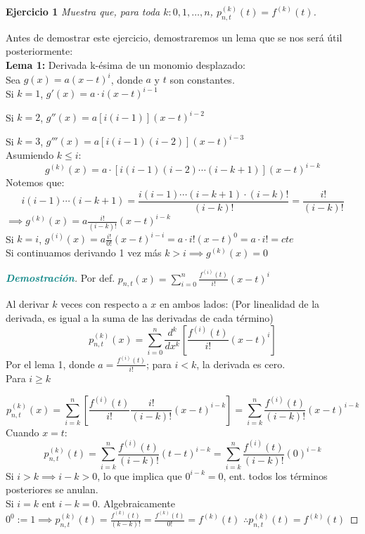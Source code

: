 \documentclass[12pt, letterpaper]{article}
\begin{document}
\vspace{0.4cm}
\noindent \textbf{Ejercicio 1} \textit{Muestra que, para toda $k : 0, 1, \dots, n$, $p_{n,t}^{(k)}(t) = f^{(k)}(t)$.}

Antes de demostrar este ejercicio, demostraremos un lema que se nos será útil posteriormente:\\

\textbf{\textcolor{burdeos}{Lema 1:}} Derivada k-ésima de un monomio desplazado:\\

Sea $g(x) = a(x-t)^i$, donde $a$ y $t$ son constantes.\\

 Si $k=1$, $g'(x) = a \cdot i(x-t)^{i-1}$
 
 Si $k=2$, $g''(x) = a[i(i-1)](x-t)^{i-2}$
 
 Si $k=3$, $g'''(x) = a[i(i-1)(i-2)](x-t)^{i-3}$\\

Asumiendo $k \leq i$:
\[ g^{(k)}(x) = a \cdot [i(i-1)(i-2) \cdots (i-k+1)](x-t)^{i-k} \]
Notemos que:
\[ i(i-1) \cdots (i-k+1) = \frac{i(i-1) \cdots (i-k+1) \cdot (i-k)!}{(i-k)!} = \frac{i!}{(i-k)!} \]
$\implies g^{(k)}(x) = a \frac{i!}{(i-k)!}(x-t)^{i-k}$\\

Si $k=i$, $g^{(i)}(x) = a \frac{i!}{0!}(x-t)^{i-i} = a \cdot i! (x-t)^0 = a \cdot i! = cte$\\

Si continuamos derivando 1 vez más $k > i \implies g^{(k)}(x) = 0$

\begin{proof}[\textbf{\textcolor{teal}{Demostración}}]

    Por def. $p_{n,t}(x) = \sum_{i=0}^{n} \frac{f^{(i)}(t)}{i!}(x-t)^i$
    
    Al derivar $k$ veces con respecto a $x$ en ambos lados: (Por linealidad de la derivada, es igual a la suma de las derivadas de cada término)
    \[ p_{n,t}^{(k)}(x) = \sum_{i=0}^{n} \frac{d^k}{dx^k} \left[ \frac{f^{(i)}(t)}{i!}(x-t)^i \right] \]
    Por el lema 1, donde $a = \frac{f^{(i)}(t)}{i!}$; para $i<k$, la derivada es cero.\\
    Para $i\geq k$
    
    \[ p_{n,t}^{(k)}(x) = \sum_{i=k}^{n} \left[ \frac{f^{(i)}(t)}{i!} \frac{i!}{(i-k)!} (x-t)^{i-k} \right] = \sum_{i=k}^{n} \frac{f^{(i)}(t)}{(i-k)!}(x-t)^{i-k} \]
    Cuando $x=t$:
    \[ p_{n,t}^{(k)}(t) = \sum_{i=k}^{n} \frac{f^{(i)}(t)}{(i-k)!}(t-t)^{i-k} = \sum_{i=k}^{n} \frac{f^{(i)}(t)}{(i-k)!}(0)^{i-k} \]
    Si $i>k \implies i-k>0$, lo que implica que $0^{i-k}=0$, ent. todos los términos posteriores se anulan.\\
    Si $i=k$ ent $i-k=0$. Algebraicamente $0^0 := 1 \implies p_{n,t}^{(k)}(t) = \frac{f^{(k)}(t)}{(k-k)!} = \frac{f^{(k)}(t)}{0!} = f^{(k)}(t)$
    $\therefore p_{n,t}^{(k)}(t) = f^{(k)}(t)$
\end{proof}
\end{document}
